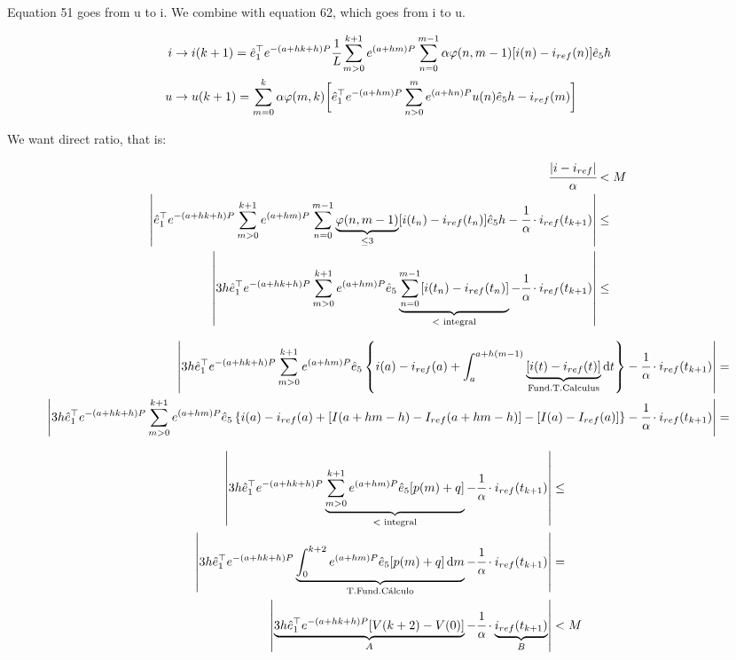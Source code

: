\documentclass[11pt]{article}
\begin{document}
Equation 51 goes from u to i. We combine with equation 62, which goes from i to u.

\begin{align}
i &\to i(k+ 1) = \hat e_1^\top e^{-(a + hk + h)P}\cfrac{1}{L}\sum_{m > 0}^{k + 1} e^{(a + hm)P}  \sum_{n = 0}^{m - 1} \alpha \varphi(n,m-1) [i(n) - i_{ref}(n)] \hat e_5 h \\
u &\to u(k + 1) = \sum_{m = 0}^k \alpha \varphi(m,k) \bigg[\hat e_1^\top e^{-(a + hm)P}\sum_{n > 0}^m e^{ (a + hn)P} u(n)\hat e_5 h - i_{ref}(m)\bigg]
\end{align}

We want direct ratio, that is:

\begin{align}
  \cfrac{|i - i_{ref}|}{\alpha} &< M \\
  \left\vert \hat e_1^\top e^{-(a + hk + h)P}\sum_{m > 0}^{k + 1} e^{ (a + hm)P}  \sum_{n = 0}^{m - 1} \underbrace{\varphi(n,m-1)}_{\le 3} [i(t_n) - i_{ref}(t_n)] \hat e_5 h - \cfrac{1}{\alpha} \cdot i_{ref}(t_{k+1}) \right\vert &\le  \\
  \left\vert 3h \hat e_1^\top e^{-(a + hk + h)P}\sum_{m > 0}^{k + 1} e^{(a + hm)P} \hat e_5 \underbrace{\sum_{n = 0}^{m - 1} [i(t_n) - i_{ref}(t_n)]}_{<\text{ integral}} - \cfrac{1}{\alpha} \cdot i_{ref}(t_{k+1}) \right\vert &\le
\end{align}

\footnotesize

\begin{align}
  \left\vert 3h \hat e_1^\top e^{- (a + hk + h)P}\sum_{m > 0}^{k + 1} e^{(a + hm)P}\hat e_5  \left\{ i(a) - i_{ref}(a) + \int_a^{a + h(m - 1)} \underbrace{[i(t) - i_{ref}(t)]}_{\text{Fund.T.Calculus}} \mathrm{d}t \right\} - \cfrac{1}{\alpha} \cdot i_{ref}(t_{k+1}) \right\vert &=  \\
  \left\vert 3h \hat e_1^\top e^{- (a + hk + h)P}\sum_{m > 0}^{k + 1} e^{ (a + hm)P}\hat e_5  \left\{ i(a) - i_{ref}(a) + [I(a + hm - h) - I_{ref}(a + hm - h)] - [I(a) - I_{ref}(a)] \right\} - \cfrac{1}{\alpha} \cdot i_{ref}(t_{k+1}) \right\vert &=
\end{align}

\normalsize

\begin{align}
  \left\vert 3h \hat e_1^\top e^{- (a + hk + h)P}\underbrace{\sum_{m > 0}^{k + 1} e^{(a+hm)P}\hat e_5 [p(m) + q]}_{<\text{ integral}}  - \cfrac{1}{\alpha} \cdot i_{ref}(t_{k+1}) \right\vert &\le  \\
  \left\vert 3h \hat e_1^\top e^{- (a + hk + h)P} \underbrace{\int_0^{k + 2} e^{(a+hm)P}\hat e_5 [p(m) + q] \,\mathrm{d}m}_{\text{T.Fund.C\'alculo}}  - \cfrac{1}{\alpha} \cdot i_{ref}(t_{k+1}) \right\vert &=  \\
  \left\vert \underbrace{3h \hat e_1^\top e^{- (a + hk + h)P} [V(k+2) - V(0)]}_A  - \cfrac{1}{\alpha} \cdot \underbrace{i_{ref}(t_{k+1})}_B \right\vert &< M
\end{align}
\end{document}
